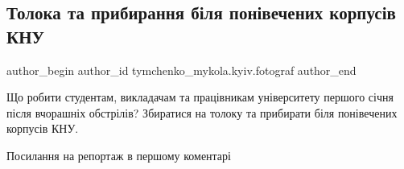  
 
 
 
 
 
\subsection{Толока та прибирання біля понівечених корпусів КНУ}
\label{sec:01_01_2023.fb.tymchenko_mykola.kyiv.fotograf.1.toloka}
 
\ifcmt
 author_begin
   author_id tymchenko_mykola.kyiv.fotograf
 author_end
\fi

Що робити студентам, викладачам та працівникам університету першого січня після
вчорашніх обстрілів? Збиратися на толоку та прибирати біля понівечених корпусів
КНУ.

Посилання на репортаж в першому коментарі
